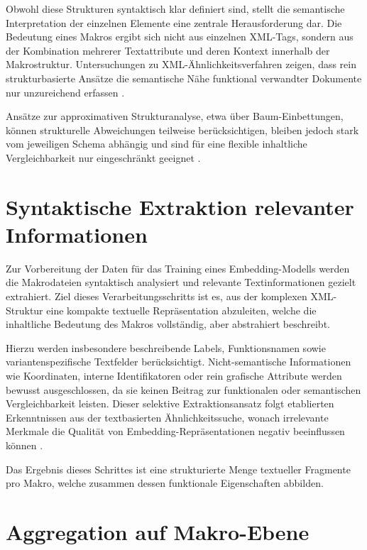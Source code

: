 Obwohl diese Strukturen syntaktisch klar definiert sind, stellt die semantische Interpretation der einzelnen Elemente eine zentrale Herausforderung dar. Die Bedeutung eines Makros ergibt sich nicht aus einzelnen XML-Tags, sondern aus der Kombination mehrerer Textattribute und deren Kontext innerhalb der Makrostruktur. Untersuchungen zu XML-Ähnlichkeitsverfahren zeigen, dass rein strukturbasierte Ansätze die semantische Nähe funktional verwandter Dokumente nur unzureichend erfassen \cite{tekli_hybrid_2007,xmlComparingSchemata}.

Ansätze zur approximativen Strukturanalyse, etwa über Baum-Einbettungen, können strukturelle Abweichungen teilweise berücksichtigen, bleiben jedoch stark vom jeweiligen Schema abhängig und sind für eine flexible inhaltliche Vergleichbarkeit nur eingeschränkt geeignet \cite{schlieder_approximate_2000}.

\section{Syntaktische Extraktion relevanter Informationen}

Zur Vorbereitung der Daten für das Training eines Embedding-Modells werden die Makrodateien syntaktisch analysiert und relevante Textinformationen gezielt extrahiert. Ziel dieses Verarbeitungsschritts ist es, aus der komplexen XML-Struktur eine kompakte textuelle Repräsentation abzuleiten, welche die inhaltliche Bedeutung des Makros vollständig, aber abstrahiert beschreibt.

Hierzu werden insbesondere beschreibende Labels, Funktionsnamen sowie variantenspezifische Textfelder berücksichtigt. Nicht-semantische Informationen wie Koordinaten, interne Identifikatoren oder rein grafische Attribute werden bewusst ausgeschlossen, da sie keinen Beitrag zur funktionalen oder semantischen Vergleichbarkeit leisten. Dieser selektive Extraktionsansatz folgt etablierten Erkenntnissen aus der textbasierten Ähnlichkeitssuche, wonach irrelevante Merkmale die Qualität von Embedding-Repräsentationen negativ beeinflussen können \cite{mishra_similarity_2020}.

Das Ergebnis dieses Schrittes ist eine strukturierte Menge textueller Fragmente pro Makro, welche zusammen dessen funktionale Eigenschaften abbilden.

\section{Aggregation auf Makro-Ebene}


